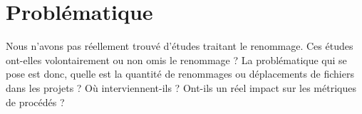 \section{Problématique}
\label{sec:problematique}
Nous n'avons pas réellement trouvé d'études traitant le renommage. Ces études ont-elles volontairement ou non omis le renommage ? La problématique qui se pose est donc, quelle est la quantité de renommages ou déplacements de fichiers dans les projets ? Où interviennent-ils ? Ont-ils un réel impact sur les métriques de procédés ? \\
